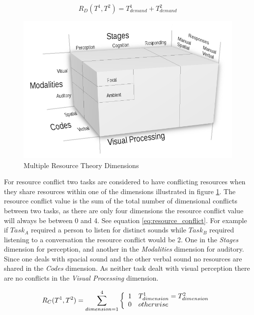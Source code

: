 \begin{equation}
  R_{D}(T^{1}, T^{2}) = T_{demand}^{1} + T_{demand}^{2}
  \label{eq:resource_demand}
\end{equation}

\begin{figure}[h]
\begin{center}
\includegraphics[width=6in]{multipleresourcetheory.png}
\caption{Multiple Resource Theory Dimensions~\cite{wickens2002multiple}}
\label{fig:multipleresourcetheory}
\end{center}
\end{figure}

For resource conflict two tasks are considered to have conflicting resources when they share resources within one of the dimensions illustrated in figure \ref{fig:multipleresourcetheory}.  The resource conflict value is the sum of the total number of dimensional conflicts between two tasks, as there are only four dimensions the resource conflict value will always be between 0 and 4.  See equation \ref{eq:resource_conflict}.  For example if $Task_{A}$ required a person to listen for distinct sounds while $Task_{B}$ required listening to a conversation the resource conflict would be 2.  One in the {\em Stages} dimension for perception, and another in the {\em Modalities} dimension for auditory.  Since one deals with spacial sound and the other verbal sound no resources are shared in the {\em Codes} dimension.  As neither task dealt with visual perception there are no conflicts in the {\em Visual Processing} dimension.

\begin{equation}
  R_{C}(T^{1}, T^{2}) = \sum_{dimension=1}^{4} \left\{
    \begin{array}{l l}
      1 & T_{dimension}^{1} = T_{dimension}^{2} \\
      0 & otherwise \\
    \end{array}
    \right.
  \label{eq:resource_conflict}
\end{equation}

